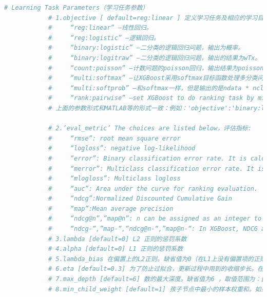 \begin{lstlisting}[language = Python]
            # Learning Task Parameters（学习任务参数）
            # 1.objective [ default=reg:linear ] 定义学习任务及相应的学习目标，可选的目标函数如下：
            #     “reg:linear” –线性回归。
            #     “reg:logistic” –逻辑回归。
            #     “binary:logistic” –二分类的逻辑回归问题，输出为概率。
            #     “binary:logitraw” –二分类的逻辑回归问题，输出的结果为wTx。
            #     “count:poisson” –计数问题的poisson回归，输出结果为poisson分布。 在poisson回归中，max_delta_step的缺省值为0.7。(used to safeguard optimization)
            #     “multi:softmax” –让XGBoost采用softmax目标函数处理多分类问题，同时需要设置参数num_class（类别个数）
            #     “multi:softprob” –和softmax一样，但是输出的是ndata * nclass的向量，可以将该向量reshape成ndata行nclass列的矩阵。没行数据表示样本所属于每个类别的概率。
            #     “rank:pairwise” –set XGBoost to do ranking task by minimizing the pairwise loss
            # 上面的参数形式和MATLAB等的形式一致：例如：'objective':'binary:logistic' 表示因变量 y 是二分类变量，用的回归函数是logistics回归。

            # 2.’eval_metric’ The choices are listed below，评估指标:
            #     “rmse”: root mean square error
            #     “logloss”: negative log-likelihood
            #     “error”: Binary classification error rate. It is calculated as #(wrong cases)/#(all cases). For the predictions, the evaluation will regard the instances with prediction value larger than 0.5 as positive instances, and the others as negative instances.
            #     “merror”: Multiclass classification error rate. It is calculated as #(wrong cases)/#(all cases).
            #     “mlogloss”: Multiclass logloss
            #     “auc”: Area under the curve for ranking evaluation.
            #     “ndcg”:Normalized Discounted Cumulative Gain
            #     “map”:Mean average precision
            #     “ndcg@n”,”map@n”: n can be assigned as an integer to cut off the top positions in the lists for evaluation.
            #     “ndcg-“,”map-“,”ndcg@n-“,”map@n-“: In XGBoost, NDCG and MAP will evaluate the score of a list without any positive samples as 1. By adding “-” in the evaluation metric XGBoost will evaluate these score as 0 to be consistent under some conditions.
            # 3.lambda [default=0] L2 正则的惩罚系数
            # 4.alpha [default=0] L1 正则的惩罚系数
            # 5.lambda_bias 在偏置上的L2正则。缺省值为0（在L1上没有偏置项的正则，因为L1时偏置不重要）
            # 6.eta [default=0.3] 为了防止过拟合，更新过程中用到的收缩步长。在每次提升计算之后，算法会直接获得新特征的权重。 eta通过缩减特征的权重使提升计算过程更加保守。缺省值为0.3, 取值范围为：[0,1]
            # 7.max_depth [default=6] 数的最大深度。缺省值为6 ，取值范围为：[1,inf]
            # 8.min_child_weight [default=1] 孩子节点中最小的样本权重和。如果一个叶子节点的样本权重和小于min_child_weight则拆分过程结束。在现行回归模型中，这个参数是指建立每个模型所需要的最小样本数。该成熟越大算法越conservative, 取值范围为: [0,inf].


\end{lstlisting}
